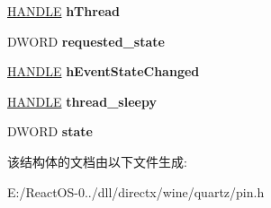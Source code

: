 \begin{DoxyCompactItemize}
\hyperlink{interfacevoid}{H\+A\+N\+D\+LE} {\bfseries h\+Thread}
\item 
\mbox{\label{struct_pull_pin_a3e021c15508cbc6666c77955e171bae0}} 
D\+W\+O\+RD {\bfseries requested\+\_\+state}
\item 
\mbox{\label{struct_pull_pin_aae28372cf0c7a6a2067f7d5245441373}} 
\hyperlink{interfacevoid}{H\+A\+N\+D\+LE} {\bfseries h\+Event\+State\+Changed}
\item 
\mbox{\label{struct_pull_pin_ae3b1f29edc3f632be2547f7f152a1c28}} 
\hyperlink{interfacevoid}{H\+A\+N\+D\+LE} {\bfseries thread\+\_\+sleepy}
\item 
\mbox{\label{struct_pull_pin_a919fb7c783c16742d885e392a080c5fe}} 
D\+W\+O\+RD {\bfseries state}
\end{DoxyCompactItemize}


该结构体的文档由以下文件生成\+:\begin{DoxyCompactItemize}
\item 
E\+:/\+React\+O\+S-\/0../dll/directx/wine/quartz/pin.\+h\end{DoxyCompactItemize}
